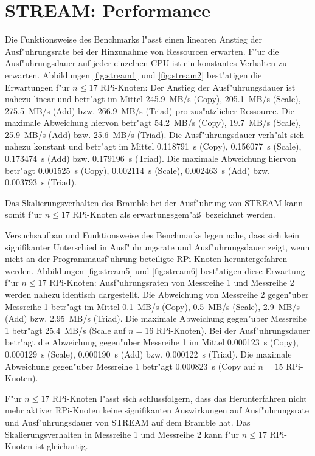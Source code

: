 \section{STREAM: Performance}\label{Interpretation-Stream}

Die Funktionsweise des Benchmarks l"asst einen linearen Anstieg der Ausf"uhrungsrate bei der Hinzunahme von Ressourcen erwarten. F"ur die Ausf"uhrungsdauer auf jeder einzelnen CPU ist ein konstantes Verhalten zu erwarten. Abbildungen \ref{fig:stream1} und \ref{fig:stream2} best"atigen die Erwartungen f"ur $n\leq 17$ RPi-Knoten: Der Anstieg der Ausf"uhrungsdauer ist nahezu linear und betr"agt im Mittel 245.9~MB/s (Copy), 205.1~MB/s (Scale), 275.5~MB/s (Add) bzw. 266.9~MB/s (Triad) pro zus"atzlicher Ressource. Die maximale Abweichung hiervon betr"agt 54.2~MB/s (Copy), 19.7~MB/s (Scale), 25.9~MB/s (Add) bzw. 25.6~MB/s (Triad). Die Ausf"uhrungsdauer verh"alt sich nahezu konstant und betr"agt im Mittel 0.118791~s (Copy), 0.156077~s (Scale), 0.173474~s (Add) bzw. 0.179196~s (Triad). Die maximale Abweichung hiervon betr"agt 0.001525~s (Copy), 0.002114~s (Scale), 0.002463~s (Add) bzw. 0.003793~s (Triad). 

Das Skalierungsverhalten des Bramble bei der Ausf"uhrung von STREAM kann somit f"ur $n\leq 17$ RPi-Knoten als erwartungsgem"a\ss\ bezeichnet werden. 

Versuchsaufbau und Funktionsweise des Benchmarks legen nahe, dass sich kein signifikanter Unterschied in Ausf"uhrungsrate und Ausf"uhrungsdauer zeigt, wenn nicht an der Programmausf"uhrung beteiligte RPi-Knoten heruntergefahren werden. Abbildungen \ref{fig:stream5} und \ref{fig:stream6} best"atigen diese Erwartung f"ur $n\leq 17$ RPi-Knoten: Ausf"uhrungsraten von Messreihe 1 und Messreihe 2 werden nahezu identisch dargestellt. Die Abweichung von Messreihe 2 gegen"uber Messreihe 1 betr"agt im Mittel 0.1~MB/s (Copy), 0.5~MB/s (Scale), 2.9~MB/s (Add) bzw. 2.95~MB/s (Triad). Die maximale Abweichung gegen"uber Messreihe 1 betr"agt 25.4~MB/s (Scale auf $n=16$ RPi-Knoten). Bei der Ausf"uhrungsdauer betr"agt die Abweichung gegen"uber Messreihe 1 im Mittel 0.000123~s (Copy), 0.000129~s (Scale), 0.000190~s (Add) bzw. 0.000122~s (Triad). Die maximale Abweichung gegen"uber Messreihe 1 betr"agt 0.000823~s (Copy auf $n=15$ RPi-Knoten). 

F"ur $n\leq 17$ RPi-Knoten l"asst sich schlussfolgern, dass das Herunterfahren nicht mehr aktiver RPi-Knoten keine signifikanten Auswirkungen auf Ausf"uhrungsrate und Ausf"uhrungsdauer von STREAM auf dem Bramble hat. Das Skalierungsverhalten in Messreihe 1 und Messreihe 2 kann f"ur $n\leq 17$ RPi-Knoten ist gleichartig.

